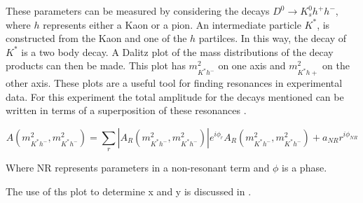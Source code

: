 These parameters can be measured by considering the decays $D^{0} \rightarrow K^{0}_{s} h^{+} h^{-}$, where $h$ represents either a Kaon or a pion. An intermediate particle $K^{*}$, is constructed from the Kaon and one of the $h$ partilces. In this way, the decay of $K^{*}$ is a two body decay. A Dalitz plot of the mass distributions of the decay products can then be made. This plot has $m^{2}_{K^{*}h^{-}}$ on one axis and $m^{2}_{K^{*}h+}$ on the other axis. These plots are a useful tool for finding resonances in experimental data. For this experiment the total amplitude for the decays mentioned can be written in terms of a superposition of these resonances \cite{Babar_D0_Review}.

\begin{equation*}
A(m^{2}_{K^{*}h^{-}},m^{2}_{K^{*}h^{-}}) = \sum_{r} |A_{R} (m^{2}_{K^{*}h^{-}},m^{2}_{K^{*}h^{-}})| e^{i \phi_{r}} A_{R} (m^{2}_{K^{*}h^{-}},m^{2}_{K^{*}h^{-}}) + a_{NR} r^{i \phi_{NR}}
\end{equation*}

\noindent Where NR represents parameters in a non-resonant term and $\phi$ is a phase. 


The use of ths plot to determine x and y is discussed in \cite{Deon_CopOut}.   
